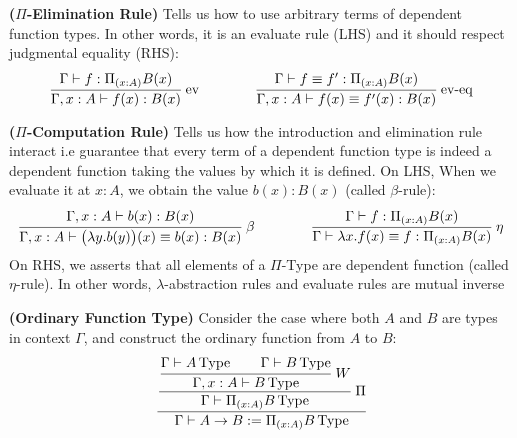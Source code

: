 \begin{definition}{\textbf{($\Pi$-Elimination Rule)}}
    Tells us how to use arbitrary terms of dependent function types. In other words, it is an evaluate rule (LHS) and it should respect judgmental equality (RHS):
    \begin{equation*}
        \cfrac{\Gamma\vdash f: \Pi_{(x:A)}B(x)}{\Gamma, x:A\vdash f(x):B(x)} \ \text{ev}
        \qquad \qquad
        \cfrac{\Gamma\vdash f\equiv f':\Pi_{(x:A)}B(x)}{\Gamma, x:A\vdash f(x)\equiv f'(x):B(x)} \ \text{ev-eq}
    \end{equation*}
\end{definition}

\begin{definition}{\textbf{($\Pi$-Computation Rule)}}
    Tells us how the introduction and elimination rule interact i.e guarantee that every term of a dependent function type is indeed a dependent function taking the values by which it is defined. On LHS, When we evaluate it at $x:A$, we obtain the value $b(x):B(x)$ (called $\beta$-rule):
    \begin{equation*}
         \cfrac{\Gamma, x:A\vdash b(x):B(x)}{\Gamma,x:A\vdash\big(\lambda y.b(y)\big)(x)\equiv b(x):B(x)}\ \beta \qquad \qquad \cfrac{\Gamma\vdash f:\Pi_{(x:A)}B(x)}{\Gamma\vdash \lambda x.f(x)\equiv f : \Pi_{(x:A)}B(x)}\ \eta
    \end{equation*}
    On RHS, we asserts that all elements of a $\Pi$-Type are dependent function (called $\eta$-rule). In other words, $\lambda$-abstraction rules and evaluate rules are mutual inverse
\end{definition}

\begin{definition}{\textbf{(Ordinary Function Type)}}
    Consider the case where both $A$ and $B$ are types in context $\Gamma$, and construct the ordinary function from $A$ to $B$:
    \begin{equation*}
        \cfrac{\cfrac{\cfrac{\Gamma\vdash A\type \qquad\Gamma\vdash B\type }{\Gamma, x:A\vdash B\type }\ W}{\Gamma\vdash\Pi_{(x:A)}B\type }\ \Pi}{\Gamma\vdash A\rightarrow B:=\Pi_{(x:A)}B\type }
    \end{equation*}
\end{definition}

